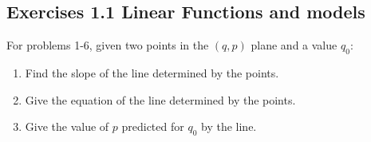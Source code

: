 \documentclass[10pt,]{book}
\theoremstyle{plain}
\theoremstyle{definition}
\theoremstyle{definition}
\begin{document}
\subsection[{Exercises 1.1 Linear Functions and models}]{Exercises 1.1 Linear Functions and models}\label{exercises-set-sec-1-1}
For problems 1-6, given two points in the \((q,p)\) plane and a value \(q_0\):%
\leavevmode%
\begin{enumerate}[label=(\alph*)]
\item\hypertarget{li-23}{}Find the slope of the line determined by the points.%
\item\hypertarget{li-24}{}Give the equation of the line determined by the points.%
\item\hypertarget{li-25}{}Give the value of \(p\) predicted for \(q_0\) by the line.%
\end{enumerate}
\end{document}
